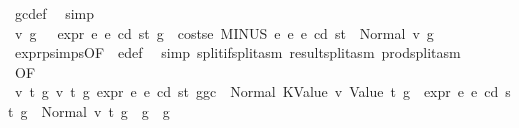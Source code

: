 \begin{isabellebody}
\ gc{\isacharunderscore}{\kern0pt}def\ \isamarkupfalse%
\ simp\isanewline
\ \ \ \ \ \ \isamarkupfalse%
\ \isamarkupfalse%
\ v\ g{\isacharprime}{\kern0pt}\ \ {\isacharasterisk}{\kern0pt}{\isacharasterisk}{\kern0pt}{\isacharasterisk}{\kern0pt}{\isacharcolon}{\kern0pt}\ {\isachardoublequoteopen}expr\ e{}\ e\ cd\ st\ {\isacharparenleft}{\kern0pt}g\ {\isacharminus}{\kern0pt}\ costs\isactrlsub e\ {\isacharparenleft}{\kern0pt}MINUS\ e{}\ e{}{\isacharparenright}{\kern0pt}\ e\ cd\ st{\isacharparenright}{\kern0pt}\ {\isacharequal}{\kern0pt}\ Normal\ {\isacharparenleft}{\kern0pt}v{\isacharcomma}{\kern0pt}\ g{\isacharprime}{\kern0pt}{\isacharparenright}{\kern0pt}{\isachardoublequoteclose}\ \isamarkupfalse%
\ expr{\isachardot}{\kern0pt}psimps{\isacharparenleft}{\kern0pt}{}{}{\isacharparenright}{\kern0pt}{\isacharbrackleft}{\kern0pt}OF\ {}{}{\isacharparenleft}{\kern0pt}{}{\isacharparenright}{\kern0pt}{\isacharbrackright}{\kern0pt}\ e{\isacharunderscore}{\kern0pt}def\ \isamarkupfalse%
\ {\isacharparenleft}{\kern0pt}simp\ split{\isacharcolon}{\kern0pt}if{\isacharunderscore}{\kern0pt}split{\isacharunderscore}{\kern0pt}asm\ result{\isachardot}{\kern0pt}split{\isacharunderscore}{\kern0pt}asm\ prod{\isachardot}{\kern0pt}split{\isacharunderscore}{\kern0pt}asm{\isacharparenright}{\kern0pt}\isanewline
\ \ \ \ \ \ \isamarkupfalse%
\ {}{}{\isacharparenleft}{\kern0pt}{}{\isacharparenright}{\kern0pt}{\isacharbrackleft}{\kern0pt}OF\ {\isacharasterisk}{\kern0pt}\ {\isacharasterisk}{\kern0pt}{\isacharasterisk}{\kern0pt}\ {\isacharasterisk}{\kern0pt}{\isacharasterisk}{\kern0pt}{\isacharasterisk}{\kern0pt}{\isacharbrackright}{\kern0pt}\ \isamarkupfalse%
\ {\isachardoublequoteopen}{\isasymAnd}v\ t\ g{\isacharprime}{\kern0pt}\ v{\isacharprime}{\kern0pt}\ t{\isacharprime}{\kern0pt}\ g{\isacharprime}{\kern0pt}{\isacharprime}{\kern0pt}{\isachardot}{\kern0pt}\ expr\ e{}\ e\ cd\ st\ {\isacharparenleft}{\kern0pt}g{\isacharminus}{\kern0pt}gc{\isacharparenright}{\kern0pt}\ {\isacharequal}{\kern0pt}\ Normal\ {\isacharparenleft}{\kern0pt}{\isacharparenleft}{\kern0pt}KValue\ v{\isacharcomma}{\kern0pt}\ Value\ t{\isacharparenright}{\kern0pt}{\isacharcomma}{\kern0pt}\ g{\isacharprime}{\kern0pt}{\isacharparenright}{\kern0pt}\ {\isasymLongrightarrow}\ expr\ e{}\ e\ cd\ st\ g{\isacharprime}{\kern0pt}\ {\isacharequal}{\kern0pt}\ Normal\ {\isacharparenleft}{\kern0pt}{\isacharparenleft}{\kern0pt}v{\isacharprime}{\kern0pt}{\isacharcomma}{\kern0pt}\ t{\isacharprime}{\kern0pt}{\isacharparenright}{\kern0pt}{\isacharcomma}{\kern0pt}\ g{\isacharprime}{\kern0pt}{\isacharprime}{\kern0pt}{\isacharparenright}{\kern0pt}\ {\isasymLongrightarrow}\ g{\isacharprime}{\kern0pt}{\isacharprime}{\kern0pt}\ {\isasymle}\ g{\isacharprime}{\kern0pt}{\isachardoublequoteclose}\ \isamarkupfalse%

\end{isabellebody}
